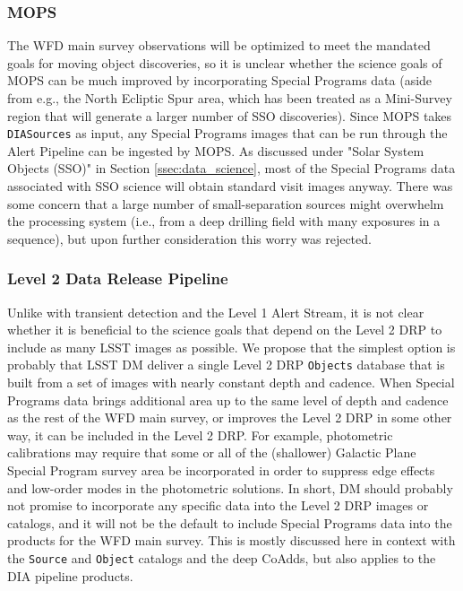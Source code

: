 \documentclass[DM,lsstdraft,toc]{lsstdoc}
\begin{document}
\subsubsection{MOPS}\label{ssec:dmplans_WFD_MOPS}

The WFD main survey observations will be optimized to meet the mandated goals for moving object discoveries, so it is unclear whether the science goals of MOPS can be much improved by incorporating Special Programs data (aside from e.g., the North Ecliptic Spur area, which has been treated as a Mini-Survey region that will generate a larger number of SSO discoveries). Since MOPS takes {\tt DIASources} as input, any Special Programs images that can be run through the Alert Pipeline can be ingested by MOPS. As discussed under "Solar System Objects (SSO)" in Section \ref{ssec:data_science}, most of the Special Programs data associated with SSO science will obtain standard visit images anyway. There was some concern that a large number of small-separation sources might overwhelm the processing system (i.e., from a deep drilling field with many exposures in a sequence), but upon further consideration this worry was rejected.

\subsubsection{Level 2 Data Release Pipeline}\label{ssec:dmplans_WFD_L2}

Unlike with transient detection and the Level 1 Alert Stream, it is not clear whether it is beneficial to the science goals that depend on the Level 2 DRP to include as many LSST images as possible. We propose that the simplest option is probably that LSST DM deliver a single Level 2 DRP {\tt Objects} database that is built from a set of images with nearly constant depth and cadence. When Special Programs data brings additional area up to the same level of depth and cadence as the rest of the WFD main survey, or improves the Level 2 DRP in some other way, it can be included in the Level 2 DRP. For example, photometric calibrations may require that some or all of the (shallower) Galactic Plane Special Program survey area be incorporated in order to suppress edge effects and low-order modes in the photometric solutions. In short, DM should probably not promise to incorporate any specific data into the Level 2 DRP images or catalogs, and it will not be the default to include Special Programs data into the products for the WFD main survey. This is mostly discussed here in context with the {\tt Source} and {\tt Object} catalogs and the deep CoAdds, but also applies to the DIA pipeline products.
\end{document}
